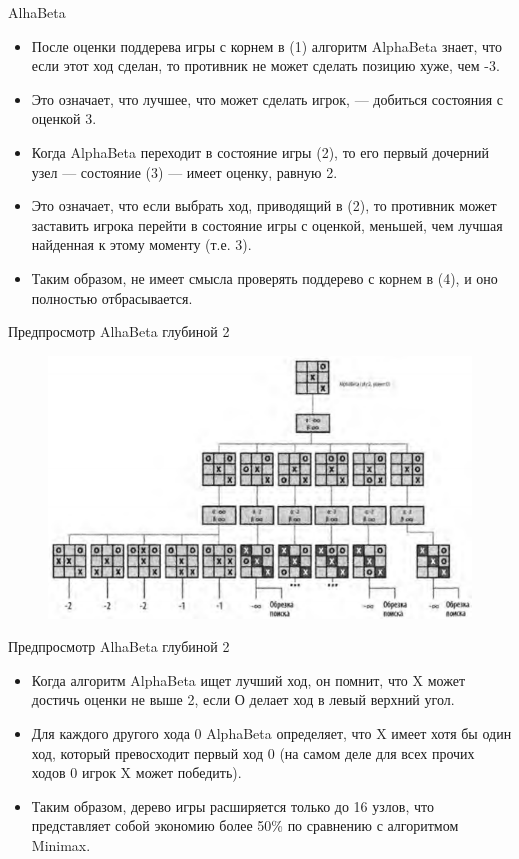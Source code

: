 \documentclass{beamer}
\begin{document}
\begin{frame}{AlhaBeta}
\begin{itemize}
\item После оценки поддерева игры с корнем в (1) алгоритм AlphaBeta знает,
что если этот ход сделан, то противник не может сделать позицию хуже, чем -3.
\item Это означает, что лучшее, что может сделать игрок, — добиться состояния с оценкой 3. 
\item Когда AlphaBeta переходит в состояние игры (2), то его первый дочерний узел — состояние (3) — имеет оценку, равную 2. 
\item Это означает, что если выбрать ход, приводящий в (2), то противник может заставить игрока перейти в состояние игры с оценкой, меньшей, чем лучшая найденная к этому моменту (т.е. 3). 
\item Таким образом, не имеет смысла проверять поддерево с корнем в (4), и оно полностью отбрасывается.
\end{itemize}
\end{frame}

\begin{frame}{Предпросмотр AlhaBeta глубиной 2}
\begin{figure}[h]
\centering
\includegraphics[scale=0.6]{images/lec05-pic09.png}
\end{figure}
\end{frame}

\begin{frame}{Предпросмотр AlhaBeta глубиной 2}
\begin{itemize}
\item Когда алгоритм AlphaBeta ищет лучший ход, он помнит, что X может
достичь оценки не выше 2, если О делает ход в левый верхний угол. 
\item Для каждого другого хода 0 AlphaBeta определяет, что X имеет хотя бы один ход, который превосходит первый ход 0 (на самом деле для всех прочих ходов 0 игрок X может победить).
\item Таким образом, дерево игры расширяется только до 16 узлов, что представляет собой экономию более 50\% по сравнению с алгоритмом Minimax. 
\end{itemize}
\end{frame}
\end{document}
